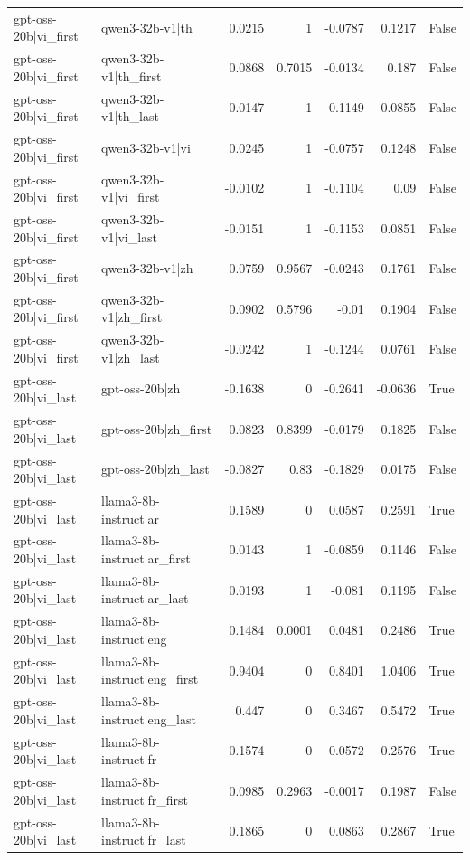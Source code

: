 \begin{table}
\begin{tabular}{l l r r r r l}
gpt-oss-20b|vi_first & qwen3-32b-v1|th & 0.0215 & 1 & -0.0787 & 0.1217 & False \\
gpt-oss-20b|vi_first & qwen3-32b-v1|th_first & 0.0868 & 0.7015 & -0.0134 & 0.187 & False \\
gpt-oss-20b|vi_first & qwen3-32b-v1|th_last & -0.0147 & 1 & -0.1149 & 0.0855 & False \\
gpt-oss-20b|vi_first & qwen3-32b-v1|vi & 0.0245 & 1 & -0.0757 & 0.1248 & False \\
gpt-oss-20b|vi_first & qwen3-32b-v1|vi_first & -0.0102 & 1 & -0.1104 & 0.09 & False \\
gpt-oss-20b|vi_first & qwen3-32b-v1|vi_last & -0.0151 & 1 & -0.1153 & 0.0851 & False \\
gpt-oss-20b|vi_first & qwen3-32b-v1|zh & 0.0759 & 0.9567 & -0.0243 & 0.1761 & False \\
gpt-oss-20b|vi_first & qwen3-32b-v1|zh_first & 0.0902 & 0.5796 & -0.01 & 0.1904 & False \\
gpt-oss-20b|vi_first & qwen3-32b-v1|zh_last & -0.0242 & 1 & -0.1244 & 0.0761 & False \\
gpt-oss-20b|vi_last & gpt-oss-20b|zh & -0.1638 & 0 & -0.2641 & -0.0636 & True \\
gpt-oss-20b|vi_last & gpt-oss-20b|zh_first & 0.0823 & 0.8399 & -0.0179 & 0.1825 & False \\
gpt-oss-20b|vi_last & gpt-oss-20b|zh_last & -0.0827 & 0.83 & -0.1829 & 0.0175 & False \\
gpt-oss-20b|vi_last & llama3-8b-instruct|ar & 0.1589 & 0 & 0.0587 & 0.2591 & True \\
gpt-oss-20b|vi_last & llama3-8b-instruct|ar_first & 0.0143 & 1 & -0.0859 & 0.1146 & False \\
gpt-oss-20b|vi_last & llama3-8b-instruct|ar_last & 0.0193 & 1 & -0.081 & 0.1195 & False \\
gpt-oss-20b|vi_last & llama3-8b-instruct|eng & 0.1484 & 0.0001 & 0.0481 & 0.2486 & True \\
gpt-oss-20b|vi_last & llama3-8b-instruct|eng_first & 0.9404 & 0 & 0.8401 & 1.0406 & True \\
gpt-oss-20b|vi_last & llama3-8b-instruct|eng_last & 0.447 & 0 & 0.3467 & 0.5472 & True \\
gpt-oss-20b|vi_last & llama3-8b-instruct|fr & 0.1574 & 0 & 0.0572 & 0.2576 & True \\
gpt-oss-20b|vi_last & llama3-8b-instruct|fr_first & 0.0985 & 0.2963 & -0.0017 & 0.1987 & False \\
gpt-oss-20b|vi_last & llama3-8b-instruct|fr_last & 0.1865 & 0 & 0.0863 & 0.2867 & True \\

\end{tabular}
\end{table}
